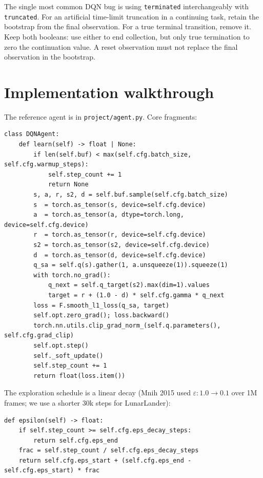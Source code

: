 \documentclass[11pt,oneside]{scrbook}
\begin{document}
\begin{pitfall}
The single most common DQN bug is using \texttt{terminated} interchangeably with
\texttt{truncated}. For an artificial time-limit truncation in a continuing task, retain the
bootstrap from the final observation. For a true terminal transition, remove
it. Keep both booleans: use either to end collection, but only true
termination to zero the continuation value. A reset observation must not
replace the final observation in the bootstrap.
\end{pitfall}

\chapter{Implementation walkthrough}

The reference agent is in \texttt{project/agent.py}. Core fragments:

\begin{verbatim}
class DQNAgent:
    def learn(self) -> float | None:
        if len(self.buf) < max(self.cfg.batch_size, self.cfg.warmup_steps):
            self.step_count += 1
            return None
        s, a, r, s2, d = self.buf.sample(self.cfg.batch_size)
        s  = torch.as_tensor(s, device=self.cfg.device)
        a  = torch.as_tensor(a, dtype=torch.long, device=self.cfg.device)
        r  = torch.as_tensor(r, device=self.cfg.device)
        s2 = torch.as_tensor(s2, device=self.cfg.device)
        d  = torch.as_tensor(d, device=self.cfg.device)
        q_sa = self.q(s).gather(1, a.unsqueeze(1)).squeeze(1)
        with torch.no_grad():
            q_next = self.q_target(s2).max(dim=1).values
            target = r + (1.0 - d) * self.cfg.gamma * q_next
        loss = F.smooth_l1_loss(q_sa, target)
        self.opt.zero_grad(); loss.backward()
        torch.nn.utils.clip_grad_norm_(self.q.parameters(), self.cfg.grad_clip)
        self.opt.step()
        self._soft_update()
        self.step_count += 1
        return float(loss.item())
\end{verbatim}

The exploration schedule is a linear decay (Mnih 2015 used $\varepsilon: 1.0 \to 0.1$ over
1M frames; we use a shorter $30$k steps for LunarLander):

\begin{verbatim}
def epsilon(self) -> float:
    if self.step_count >= self.cfg.eps_decay_steps:
        return self.cfg.eps_end
    frac = self.step_count / self.cfg.eps_decay_steps
    return self.cfg.eps_start + (self.cfg.eps_end - self.cfg.eps_start) * frac
\end{verbatim}
\end{document}

